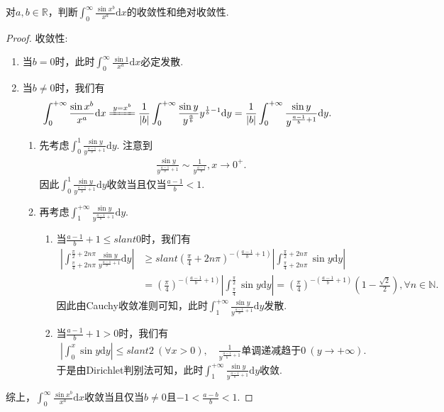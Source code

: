 \documentclass[../../main.tex]{subfiles}
\begin{document}
\begin{example}
对\(a,b\in\mathbb{R}\)，判断\(\int_{0}^{\infty}\frac{\sin x^b}{x^a}\mathrm{d}x\)的收敛性和绝对收敛性. 
\end{example}
\begin{proof}
{\heiti 收敛性:}
\begin{enumerate}
    \item 当\(b = 0\)时，此时\(\int_{0}^{\infty}\frac{\sin 1}{x^a}\mathrm{d}x\)必定发散.
    \item 当\(b\neq 0\)时，我们有
\begin{align}\label{100.52}
\int_{0}^{+\infty}\frac{\sin x^b}{x^a}\mathrm{d}x&\xlongequal{y = x^b}\frac{1}{|b|}\int_{0}^{+\infty}\frac{\sin y}{y^{\frac{a}{b}}}y^{\frac{1}{b}-1}\mathrm{d}y=\frac{1}{|b|}\int_{0}^{+\infty}\frac{\sin y}{y^{\frac{a - 1}{b}+1}}\mathrm{d}y.
\end{align}
    \begin{enumerate}
        \item 先考虑\(\int_{0}^{1}\frac{\sin y}{y^{\frac{a - 1}{b}+1}}\mathrm{d}y\). 注意到
\begin{align*}
\frac{\sin y}{y^{\frac{a - 1}{b}+1}}\sim\frac{1}{y^{\frac{a - 1}{b}}},x\rightarrow 0^+.
\end{align*}
因此\(\int_{0}^{1}\frac{\sin y}{y^{\frac{a - 1}{b}+1}}\mathrm{d}y\)收敛当且仅当\(\frac{a - 1}{b}<1\).
        \item 再考虑\(\int_{1}^{+\infty}\frac{\sin y}{y^{\frac{a - 1}{b}+1}}\mathrm{d}y\).
        \begin{enumerate}
            \item 当\(\frac{a - 1}{b}+1\leqslant slant 0\)时，我们有
\begin{align*}
\left|\int_{\frac{\pi}{4}+2n\pi}^{\frac{\pi}{2}+2n\pi}\frac{\sin y}{y^{\frac{a - 1}{b}+1}}\mathrm{d}y\right| &\geqslant slant \left(\frac{\pi}{4}+2n\pi\right)^{-\left(\frac{a - 1}{b}+1\right)}\left|\int_{\frac{\pi}{4}+2n\pi}^{\frac{\pi}{2}+2n\pi}\sin y\mathrm{d}y\right|\\
&=\left(\frac{\pi}{4}\right)^{-\left(\frac{a - 1}{b}+1\right)}\left|\int_{\frac{\pi}{4}}^{\frac{\pi}{2}}\sin y\mathrm{d}y\right|=\left(\frac{\pi}{4}\right)^{-\left(\frac{a - 1}{b}+1\right)}\left(1 - \frac{\sqrt{2}}{2}\right),\forall n\in\mathbb{N}.
\end{align*}
因此由Cauchy收敛准则可知，此时\(\int_{1}^{+\infty}\frac{\sin y}{y^{\frac{a - 1}{b}+1}}\mathrm{d}y\)发散.
            \item 当\(\frac{a - 1}{b}+1>0\)时，我们有
\begin{align*}
\left|\int_{0}^{x}\sin y\mathrm{d}y\right|\leqslant slant 2\ (\forall x > 0),\quad \frac{1}{y^{\frac{a - 1}{b}+1}}\text{单调递减趋于}0\ (y\rightarrow +\infty).
\end{align*}
于是由Dirichlet判别法可知，此时\(\int_{1}^{+\infty}\frac{\sin y}{y^{\frac{a - 1}{b}+1}}\mathrm{d}y\)收敛.
        \end{enumerate}
    \end{enumerate}
\end{enumerate}
综上，\(\int_{0}^{\infty}\frac{\sin x^b}{x^a}\mathrm{d}x\)收敛当且仅当\(b\neq 0\)且\(-1<\frac{a - b}{b}<1\).


\end{proof}
\end{document}
